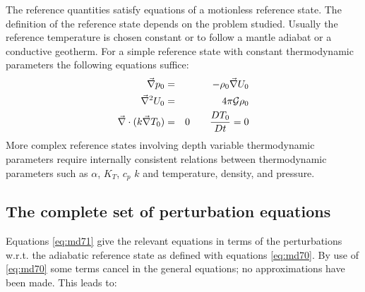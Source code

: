 
\vspace{0.5cm}

The reference quantities satisfy equations of a motionless reference state. The definition
of the reference state depends on the problem studied. Usually the reference temperature
is chosen constant or to follow a mantle adiabat or a conductive geotherm. For a simple
reference state with constant thermodynamic parameters the following equations suffice:
\begin{eqnarray}
\vec\nabla p_0 &=& -\rho_0 \vec\nabla U_0 \\
\vec\nabla^2 U_0 &=& 4\pi {\cal G} \rho_0 \\
\vec\nabla \cdot ( k \vec\nabla T_0) &=& 0 \qquad \frac{DT_0}{Dt}=0
\label{eq:md70}
\end{eqnarray}
More complex reference states involving depth variable thermodynamic parameters
require internally consistent relations between thermodynamic parameters such as
$\alpha$, $K_T$, $c_p$ $k$ and temperature, density, and pressure.



\subsection{The complete set of perturbation equations}

Equations \eqref{eq:md71} give the relevant equations in terms of the perturbations w.r.t. the
adiabatic reference state as defined with equations \eqref{eq:md70}. By use of \eqref{eq:md70} 
some terms cancel in the general equations; no approximations have been made. This leads to:

